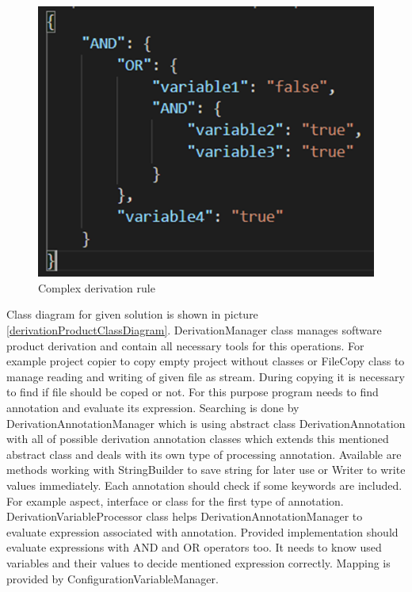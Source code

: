 \documentclass[11pt,slovak,a4paper,twoside]{article}
\begin{document}
\begin{figure}[t]  %
					\begin{center}
									\includegraphics[width=0.65\linewidth]{fig/expresion.png}
									\caption{Complex derivation rule}
									\label{complexDerivationRule}
					\end{center}
\end{figure}


Class diagram for given solution is shown in picture \ref{derivationProductClassDiagram}. DerivationManager class manages software product derivation and contain all necessary tools for this operations. For example project copier to copy empty project without classes or FileCopy class to manage reading and writing of given file as stream. During copying it is necessary to find if file should be coped or not. For this purpose program needs to find annotation and evaluate its expression. Searching is done by DerivationAnnotationManager which is using abstract class DerivationAnnotation with all of possible derivation annotation classes which extends this mentioned abstract class and deals with its own type of processing annotation. Available are methods working with StringBuilder to save string for later use or Writer to write values immediately. Each annotation should check if some keywords are included. For example aspect, interface or class for the first type of annotation. DerivationVariableProcessor class helps DerivationAnnotationManager to evaluate expression associated with annotation. Provided implementation should evaluate expressions with AND and OR operators too. It needs to know used variables and their values to decide mentioned expression correctly. Mapping is provided by ConfigurationVariableManager.
\end{document}
